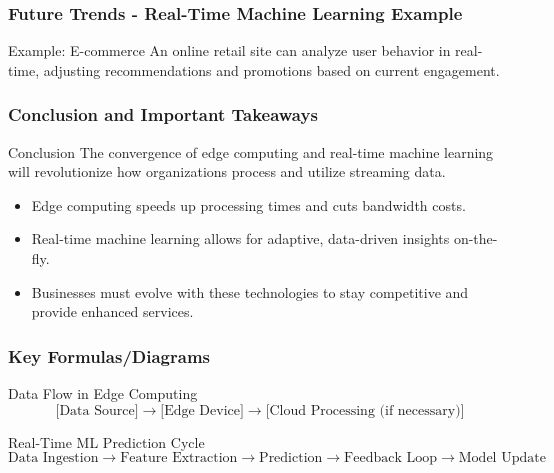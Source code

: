 \documentclass[aspectratio=169]{beamer}
\begin{document}
\begin{frame}[fragile]
    \frametitle{Future Trends - Real-Time Machine Learning Example}
    \begin{block}{Example: E-commerce}
        An online retail site can analyze user behavior in real-time, adjusting recommendations and promotions based on current engagement.
    \end{block}
\end{frame}

\begin{frame}[fragile]
    \frametitle{Conclusion and Important Takeaways}
    \begin{block}{Conclusion}
        The convergence of edge computing and real-time machine learning will revolutionize how organizations process and utilize streaming data.
    \end{block}

    \begin{itemize}
        \item Edge computing speeds up processing times and cuts bandwidth costs.
        \item Real-time machine learning allows for adaptive, data-driven insights on-the-fly.
        \item Businesses must evolve with these technologies to stay competitive and provide enhanced services.
    \end{itemize}
\end{frame}

\begin{frame}[fragile]
    \frametitle{Key Formulas/Diagrams}
    \begin{block}{Data Flow in Edge Computing}
        \begin{equation}
            \text{[Data Source]} \rightarrow \text{[Edge Device]} \rightarrow \text{[Cloud Processing (if necessary)]}
        \end{equation}
    \end{block}

    \begin{block}{Real-Time ML Prediction Cycle}
        \begin{equation}
            \text{Data Ingestion} \rightarrow \text{Feature Extraction} \rightarrow \text{Prediction} \rightarrow \text{Feedback Loop} \rightarrow \text{Model Update}
        \end{equation}
    \end{block}
\end{frame}
\end{document}
